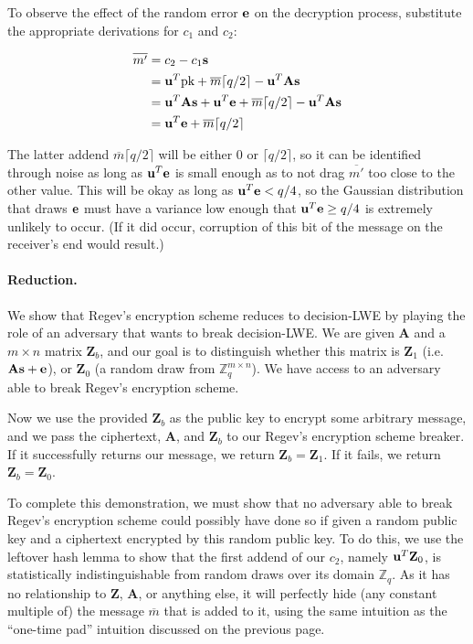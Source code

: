 To observe the effect of the random error ${{\bf e}}$ on the decryption process, 
substitute the appropriate derivations for $c_1$ and $c_2$:

\begin{align*}
  \overline{m'}
    &= c_2 - c_1\mathbf{s}\\
	&= \mathbf{u}^T\textnormal{pk} + \overline{m}\lceil q/2\rceil -   
	\mathbf{u}^T\textbf{A}\mathbf{s} \\
	&= \mathbf{u}^T\textbf{A}\mathbf{s} + \mathbf{u}^T{{\bf e}} + \overline{m}\lceil q/2\rceil -   
	\mathbf{u}^T\textbf{A}\mathbf{s} \\
	&= \mathbf{u}^T{{\bf e}} + \overline{m}\lceil q/2\rceil
\end{align*}

The latter addend $\overline{m}\lceil q/2 \rceil$ will be either $0$ or $\lceil 
q/2 \rceil$, so it can be identified through noise as long as $\mathbf{u}^T{{\bf e}}$ is 
small enough as to not drag $\overline{m'}$ too close to the other value. This 
will be okay as long as $\mathbf{u}^T{{\bf e}} < q/4$, so the Gaussian distribution that 
draws ${{\bf e}}$ must have a variance low enough that $\mathbf{u}^T{{\bf e}} \ge q/4$ is 
extremely unlikely to occur. (If it did occur, corruption of this bit of the 
message on the receiver's end would result.)

\paragraph{Reduction.}
We show that Regev's encryption scheme reduces to decision-LWE by playing the 
role of an adversary that wants to break decision-LWE. We are given $\textbf{A}$ 
and a $m \times n$ matrix $\textbf{Z}_b$, and our goal is to distinguish whether 
this matrix is $\textbf{Z}_1$ (i.e. $\textbf{A}\mathbf{s} + {{\bf e}}$), or 
$\textbf{Z}_0$ (a random draw from $\mathbb{Z}_q^{m \times n}$). We have access 
to an adversary able to break Regev's encryption scheme.

Now we use the provided $\textbf{Z}_b$ as the public key to encrypt some 
arbitrary message, and we pass the ciphertext, $\textbf{A}$, and $\textbf{Z}_b$ 
to our Regev's encryption scheme breaker. If it successfully returns our 
message, we return $\textbf{Z}_b = \textbf{Z}_1$. If it fails, we return 
$\textbf{Z}_b = \textbf{Z}_0$.

To complete this demonstration, we must show that no adversary able to break 
Regev's encryption scheme could possibly have done so if given a random public 
key and a ciphertext encrypted by this random public key. To do this, we use the 
leftover hash lemma to show that the first addend of our $c_2$, namely 
$\mathbf{u}^T\textbf{Z}_0$, is statistically indistinguishable from random draws over 
its domain $\mathbb{Z}_q$. As it has no relationship to $\textbf{Z}$, 
$\textbf{A}$, or anything else, it will perfectly hide (any constant multiple 
of) the message $\overline{m}$ that is added to it, using the same intuition as 
the ``one-time pad'' intuition discussed on the previous page.


